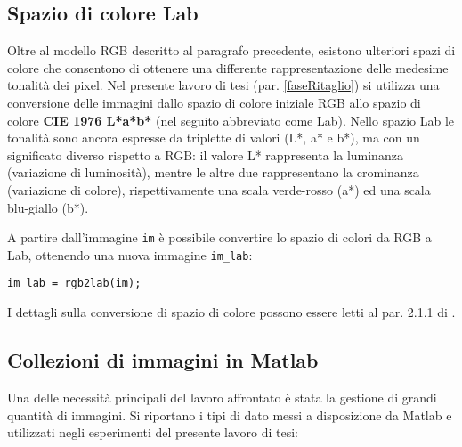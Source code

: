 \subsection{Spazio di colore Lab}
Oltre al modello RGB descritto al paragrafo precedente, esistono ulteriori spazi di colore che consentono di ottenere una differente rappresentazione delle medesime tonalità dei pixel.
Nel presente lavoro di tesi (par. \ref{faseRitaglio}) si utilizza una conversione delle immagini dallo spazio di colore iniziale RGB allo spazio di colore \textbf{CIE 1976 L*a*b*} (nel seguito abbreviato come Lab).
Nello spazio Lab le tonalità sono ancora espresse da triplette di valori (L*, a* e b*), ma con un significato diverso rispetto a RGB: il valore L* rappresenta la luminanza
(variazione di luminosità), mentre le altre due rappresentano la crominanza (variazione
di colore), rispettivamente una scala verde-rosso (a*) ed una scala blu-giallo (b*).

A partire dall’immagine \verb|im| è possibile convertire lo spazio di colori da RGB a Lab, ottenendo una nuova immagine \verb|im_lab|:
\begin{verbatim}
im_lab = rgb2lab(im);
\end{verbatim}
I dettagli sulla conversione di spazio di colore possono essere letti al par. 2.1.1 di \cite{gianvito}.

\subsection{Collezioni di immagini in Matlab}
\label{datastore}
Una delle necessità principali del lavoro affrontato è stata la gestione di grandi quantità di immagini. Si riportano i tipi di dato messi a disposizione da Matlab e utilizzati negli esperimenti del presente lavoro di tesi:

